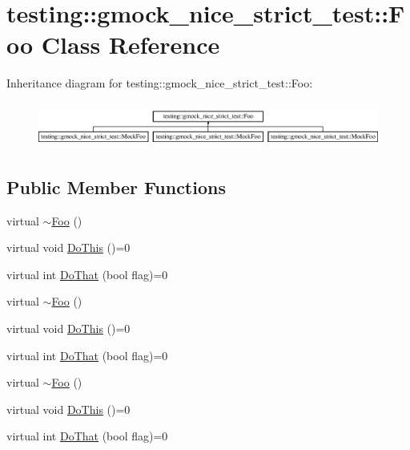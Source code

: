 \hypertarget{classtesting_1_1gmock__nice__strict__test_1_1_foo}{}\section{testing\+::gmock\+\_\+nice\+\_\+strict\+\_\+test\+::Foo Class Reference}
\label{classtesting_1_1gmock__nice__strict__test_1_1_foo}
Inheritance diagram for testing\+::gmock\+\_\+nice\+\_\+strict\+\_\+test\+::Foo\+:\begin{figure}[H]
\begin{center}
\leavevmode
\includegraphics[height=1.505376cm]{d9/d9b/classtesting_1_1gmock__nice__strict__test_1_1_foo}
\end{center}
\end{figure}
\subsection*{Public Member Functions}
\begin{DoxyCompactItemize}
\item 
virtual \mbox{\hyperlink{classtesting_1_1gmock__nice__strict__test_1_1_foo_a7170ef9752ff35a749e63940461fb7ec}{$\sim$\+Foo}} ()
\item 
virtual void \mbox{\hyperlink{classtesting_1_1gmock__nice__strict__test_1_1_foo_a79a3cdbd8d9d9f6bc87580563b0d7cec}{Do\+This}} ()=0
\item 
virtual int \mbox{\hyperlink{classtesting_1_1gmock__nice__strict__test_1_1_foo_a8527a459b03f333a809a3376311a9f8b}{Do\+That}} (bool flag)=0
\item 
virtual \mbox{\hyperlink{classtesting_1_1gmock__nice__strict__test_1_1_foo_a7170ef9752ff35a749e63940461fb7ec}{$\sim$\+Foo}} ()
\item 
virtual void \mbox{\hyperlink{classtesting_1_1gmock__nice__strict__test_1_1_foo_a79a3cdbd8d9d9f6bc87580563b0d7cec}{Do\+This}} ()=0
\item 
virtual int \mbox{\hyperlink{classtesting_1_1gmock__nice__strict__test_1_1_foo_a8527a459b03f333a809a3376311a9f8b}{Do\+That}} (bool flag)=0
\item 
virtual \mbox{\hyperlink{classtesting_1_1gmock__nice__strict__test_1_1_foo_a7170ef9752ff35a749e63940461fb7ec}{$\sim$\+Foo}} ()
\item 
virtual void \mbox{\hyperlink{classtesting_1_1gmock__nice__strict__test_1_1_foo_a79a3cdbd8d9d9f6bc87580563b0d7cec}{Do\+This}} ()=0
\item 
virtual int \mbox{\hyperlink{classtesting_1_1gmock__nice__strict__test_1_1_foo_a8527a459b03f333a809a3376311a9f8b}{Do\+That}} (bool flag)=0
\end{DoxyCompactItemize}


